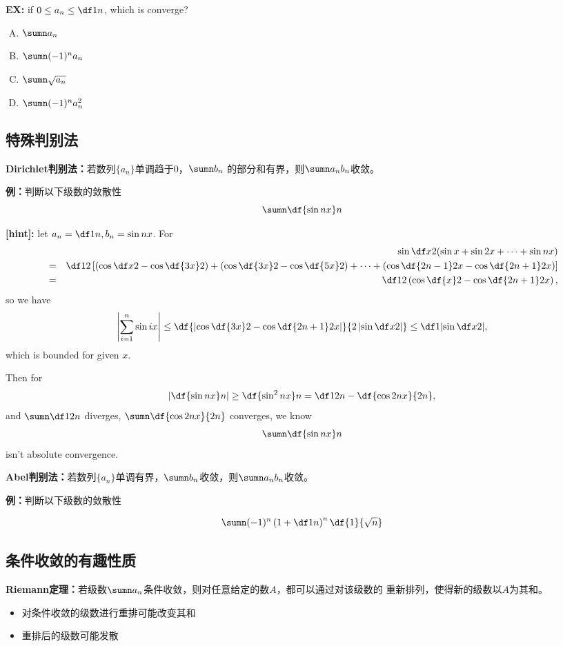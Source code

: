 {\bf EX:} if $0\leq a_n\leq\df1n$, which is converge?
\begin{enumerate}[(A)]
  \setlength{\itemindent}{1cm}
  \item $\sumn a_n$
  \item $\sumn (-1)^na_n$
  \item $\sumn \sqrt{a_n}$
  \item $\sumn (-1)^na^2_n$
\end{enumerate}

\begin{shaded}

\subsection{特殊判别法}

{\bf Dirichlet判别法：}若数列$\{a_n\}$单调趋于$0$，$\sumn b_n$
  的部分和有界，则$\sumn a_nb_n$收敛。
  
{\bf 例：}判断以下级数的敛散性
$$\sumn\df{\sin nx}n$$

{\bf [hint]:}
let $a_n=\df1n,b_n=\sin nx$. For
\begin{eqnarray*}
&&\sin\df x2(\sin x+\sin2x+\cdots+\sin nx)\\
&=&\df12\left[\left(\cos\df x2-\cos\df{3x}2\right)+
\left(\cos\df {3x}2-\cos\df{5x}2\right)+\cdots+
\left(\cos\df {2n-1}2x-\cos\df{2n+1}2x\right)\right]\\
&=&\df12\left(\cos\df{x}2-\cos\df{2n+1}2x\right),
\end{eqnarray*}
so we have
$$\left|\sum\limits_{i=1}^n\sin ix\right|
\leq\df{\left|\cos\df{3x}2-\cos\df{2n+1}2x\right|}{2\left|\sin\df x2\right|}
\leq\df1{\left|\sin\df x2\right|},$$
which is bounded for given $x$.

Then for
$$\left|\df{\sin nx}n\right|\geq\df{\sin^2nx}n=\df1{2n}-\df{\cos2nx}{2n},$$
and $\sumn\df1{2n}$ diverges, $\sumn\df{\cos2nx}{2n}$ converges, we know
$$\sumn\df{\sin nx}n$$ isn't absolute convergence.

{\bf Abel判别法：}若数列$\{a_n\}$单调有界，$\sumn b_n$收敛，则$\sumn a_nb_n$收敛。

{\bf 例：}判断以下级数的敛散性

$$\sumn(-1)^n\left(1+\df 1n\right)^n\df{1}{\sqrt n}$$ 

\subsection{条件收敛的有趣性质}

{\bf Riemann定理：}若级数$\sumn a_n$条件收敛，则对任意给定的数$A$，都可以通过对该级数的
重新排列，使得新的级数以$A$为其和。

\begin{itemize}
  \item 对条件收敛的级数进行重排可能改变其和
  \item 重排后的级数可能发散
\end{itemize}

\end{shaded}

